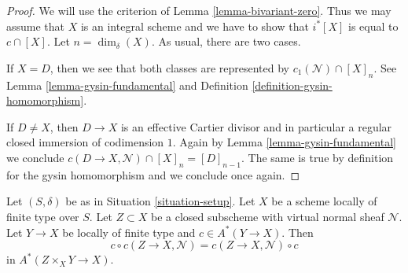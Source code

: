 \begin{proof}
We will use the criterion of Lemma \ref{lemma-bivariant-zero}.
Thus we may assume that $X$ is an integral scheme and
we have to show that $i^*[X]$ is equal to $c \cap [X]$.
Let $n = \dim_\delta(X)$. As usual, there are two cases.

\medskip\noindent
If $X = D$, then we see that both classes are represented by
$c_1(\mathcal{N}) \cap [X]_n$. See Lemma \ref{lemma-gysin-fundamental}
and Definition \ref{definition-gysin-homomorphism}.

\medskip\noindent
If $D \not = X$, then $D \to X$ is an effective Cartier divisor
and in particular a regular closed immersion of codimension $1$.
Again by Lemma \ref{lemma-gysin-fundamental} we conclude
$c(D \to X, \mathcal{N}) \cap [X]_n = [D]_{n - 1}$. The same
is true by definition for the gysin homomorphism and we conclude
once again.
\end{proof}

\begin{lemma}
\label{lemma-gysin-commutes}
Let $(S, \delta)$ be as in Situation \ref{situation-setup}. Let $X$ be a scheme
locally of finite type over $S$. Let $Z \subset X$ be a closed subscheme
with virtual normal sheaf $\mathcal{N}$. Let $Y \to X$ be locally of
finite type and $c \in A^*(Y \to X)$. Then
$$
c \circ c(Z \to X, \mathcal{N}) =
c(Z \to X, \mathcal{N}) \circ c
$$
in $A^*(Z \times_X Y \to X)$.
\end{lemma}

